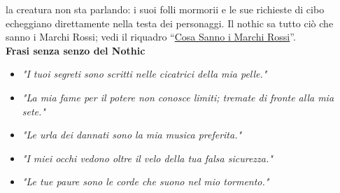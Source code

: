 \documentclass{article}
\begin{document}
    la creatura non sta parlando: i suoi folli mormorii e le sue
    richieste di cibo echeggiano direttamente nella testa dei
    personaggi. Il nothic sa tutto ciò che sanno i Marchi Rossi;
    vedi il riquadro “\hyperlink{cosasanno}{Cosa Sanno i Marchi Rossi}”. \\
    \textbf{Frasi senza senzo del Nothic}\\
    \begin{itemize}
        \item \textit{"I tuoi segreti sono scritti nelle cicatrici della mia pelle."}
        \item \textit{"La mia fame per il potere non conosce limiti; tremate di fronte alla mia sete."}
        \item \textit{"Le urla dei dannati sono la mia musica preferita."}
        \item \textit{"I miei occhi vedono oltre il velo della tua falsa sicurezza."}
        \item \textit{"Le tue paure sono le corde che suono nel mio tormento."}
    \end{itemize}
\end{document}
